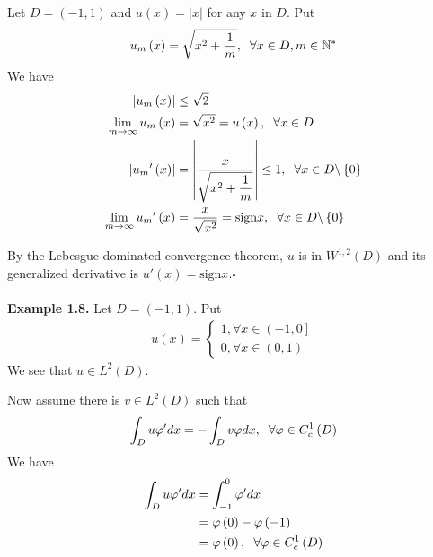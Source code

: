 \documentclass[a4paper]{article}
\numberwithin{equation}{section}
\begin{document}
Let $D=\left(-1,1\right)$ and $u\left( x \right) = \left| x \right|$ for any $x$ in $D$. Put
\begin{align}
{u_m}\left( x \right) = \sqrt {{x^2} + \dfrac{1}{m}} ,\hspace{0.2cm}\forall x \in D,m \in {\mathbb{N}^*}
\end{align}
We have
\begin{align}
\left| {{u_m}\left( x \right)} \right| &\le \sqrt 2 \\
\mathop {\lim }\limits_{m \to \infty } {u_m}\left( x \right) &= \sqrt {{x^2}}  = u\left( x \right),\hspace{0.2cm}\forall x \in D\\
\left| {{u_m}'\left( x \right)} \right| &= \left| {\dfrac{x}{{\sqrt {{x^2} + \dfrac{1}{m}} }}} \right| \le 1,\hspace{0.2cm}\forall x \in D\backslash \left\{ 0 \right\}\\
\mathop {\lim }\limits_{m \to \infty } {u_m}'\left( x \right) &= \dfrac{x}{{\sqrt {{x^2}} }} = \mbox{sign}x,\hspace{0.2cm}\forall x \in D\backslash \left\{ 0 \right\}
\end{align}

By the Lebesgue dominated convergence theorem, $u$ is in $W^{1,2}\left(D\right)$ and its generalized derivative is $u'\left(x\right)=\mbox{sign} x$.\hfill $\square$ \\
\\
\textbf{Example 1.8.} Let $D=\left(-1,1\right)$. Put
\begin{align}
u\left( x \right) = \left\{ {\begin{array}{*{20}{c}}
{1,\forall x \in \left( { - 1,0} \right]}\\
{0,\forall x \in \left( {0,1} \right)}
\end{array}} \right.
\end{align}
We see that $u\in L^2\left(D\right)$.

Now assume there is $v\in L^2\left(D\right)$ such that
\begin{align}
\label{1.40}
\int_D {u\varphi 'dx}  =  - \int_D {v\varphi dx} ,\hspace{0.2cm}\forall \varphi  \in C_c^1\left( D \right)
\end{align}
We have
\begin{align}
\int_D {u\varphi 'dx}  &= \int_{ - 1}^0 {\varphi 'dx} \\
& = \varphi \left( 0 \right) - \varphi \left( { - 1} \right)\\
& = \varphi \left( 0 \right),\hspace{0.2cm}\forall \varphi  \in C_c^1\left( D \right) \label{1.43}
\end{align}
\end{document}
